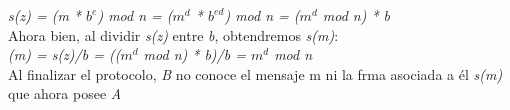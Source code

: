 \textit{s(z) = (m *  $b^{e}$) mod n = ($m^{d}$ *  $b^{ed}$) mod n = ($m^{d}$ mod n) * b} \\

Ahora bien, al dividir \textit{s(z)} entre \textit{b}, obtendremos \textit{s(m)}: \\

\textit{(m) = s(z)/b = (($m^{d}$ mod n) * b)/b = $m^{d}$ mod n} \\

Al finalizar el protocolo, \textit{B} no conoce el mensaje m ni la frma asociada a él \textit{s(m)} que ahora posee \textit{A} ~\cite{ciegas} \\








